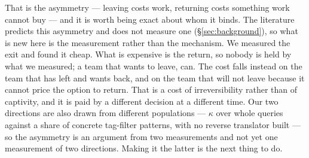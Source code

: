 That is the asymmetry --- leaving costs work, returning costs something work cannot buy
--- and it is worth being exact about whom it binds. The literature predicts this
asymmetry and does not measure one (\S\ref{sec:background}), so what is new here is the
measurement rather than the mechanism. We measured the exit and found it cheap. What is
expensive is the return, so nobody is held by what we measured; a team that wants to
leave, can. The cost falls instead on the team that has left and wants back, and on the
team that will not leave because it cannot price the option to return. That is a cost of
irreversibility rather than of captivity, and it is paid by a different decision at a
different time. Our two directions are also drawn from different populations ---
$\kappa$ over whole queries against a share of concrete tag-filter patterns, with no
reverse translator built --- so the asymmetry is an argument from two measurements and
not yet one measurement of two directions. Making it the latter is the next thing to do.
